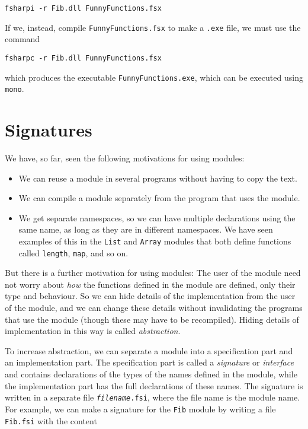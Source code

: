 \documentclass[a4paper]{article}
\begin{document}
\renewcommand{\baselinestretch}{0.9}
\begin{verbatim}
fsharpi -r Fib.dll FunnyFunctions.fsx
\end{verbatim}
\renewcommand{\baselinestretch}{1}

\noindent
If we, instead, compile \texttt{FunnyFunctions.fsx} to make a
\texttt{.exe} file, we must use the command


\renewcommand{\baselinestretch}{0.9}
\begin{verbatim}
fsharpc -r Fib.dll FunnyFunctions.fsx
\end{verbatim}
\renewcommand{\baselinestretch}{1}

\noindent
which produces the executable \texttt{FunnyFunctions.exe}, which can
be executed using \texttt{mono}.

\section{Signatures}

We have, so far, seen the following motivations for using modules:

\begin{itemize}
\item We can reuse a module in several programs without having to copy
  the text.
\item We can compile a module separately from the program that uses
  the module.
\item We get separate namespaces, so we can have multiple
  declarations using the same name, as long as they are in different
  namespaces.  We have seen examples of this in the \texttt{List} and
  \texttt{Array} modules that both define functions called
  \texttt{length}, \texttt{map}, and so on.
\end{itemize}

\noindent
But there is a further motivation for using modules: The user of the
module need not worry about \emph{how} the functions defined in the
module are defined, only their type and behaviour.  So we can hide
details of the implementation from the user of the module, and we can
change these details without invalidating the programs that use the
module (though these may have to be recompiled).  Hiding details of
implementation in this way is called \emph{abstraction}.

To increase abstraction, we can separate a module into a specification
part and an implementation part.  The specification part is called a
\emph{signature} or \emph{interface} and contains declarations of the
types of the names defined in the module, while the implementation
part has the full declarations of these names.  The signature is
written in a separate file \texttt{\emph{filename}.fsi}, where the
file name is the module name.  For example, we can make a signature
for the \texttt{Fib} module by writing a file \texttt{Fib.fsi} with
the content
\end{document}
